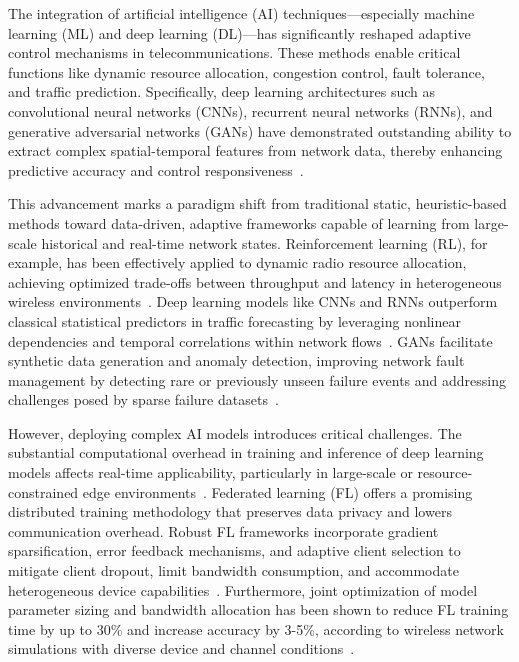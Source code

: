 \documentclass[sigconf]{acmart}
\begin{document}
The integration of artificial intelligence (AI) techniques—especially machine learning (ML) and deep learning (DL)—has significantly reshaped adaptive control mechanisms in telecommunications. These methods enable critical functions like dynamic resource allocation, congestion control, fault tolerance, and traffic prediction. Specifically, deep learning architectures such as convolutional neural networks (CNNs), recurrent neural networks (RNNs), and generative adversarial networks (GANs) have demonstrated outstanding ability to extract complex spatial-temporal features from network data, thereby enhancing predictive accuracy and control responsiveness~\cite{ref1,ref2,ref3,ref5,ref6,ref10,ref11,ref14,ref50}.

This advancement marks a paradigm shift from traditional static, heuristic-based methods toward data-driven, adaptive frameworks capable of learning from large-scale historical and real-time network states. Reinforcement learning (RL), for example, has been effectively applied to dynamic radio resource allocation, achieving optimized trade-offs between throughput and latency in heterogeneous wireless environments~\cite{ref1,ref7}. Deep learning models like CNNs and RNNs outperform classical statistical predictors in traffic forecasting by leveraging nonlinear dependencies and temporal correlations within network flows~\cite{ref2,ref3,ref5}. GANs facilitate synthetic data generation and anomaly detection, improving network fault management by detecting rare or previously unseen failure events and addressing challenges posed by sparse failure datasets~\cite{ref6,ref10}.

However, deploying complex AI models introduces critical challenges. The substantial computational overhead in training and inference of deep learning models affects real-time applicability, particularly in large-scale or resource-constrained edge environments~\cite{ref4,ref5}. Federated learning (FL) offers a promising distributed training methodology that preserves data privacy and lowers communication overhead. Robust FL frameworks incorporate gradient sparsification, error feedback mechanisms, and adaptive client selection to mitigate client dropout, limit bandwidth consumption, and accommodate heterogeneous device capabilities~\cite{ref4}. Furthermore, joint optimization of model parameter sizing and bandwidth allocation has been shown to reduce FL training time by up to 30\% and increase accuracy by 3-5\%, according to wireless network simulations with diverse device and channel conditions~\cite{ref5}.
\end{document}
